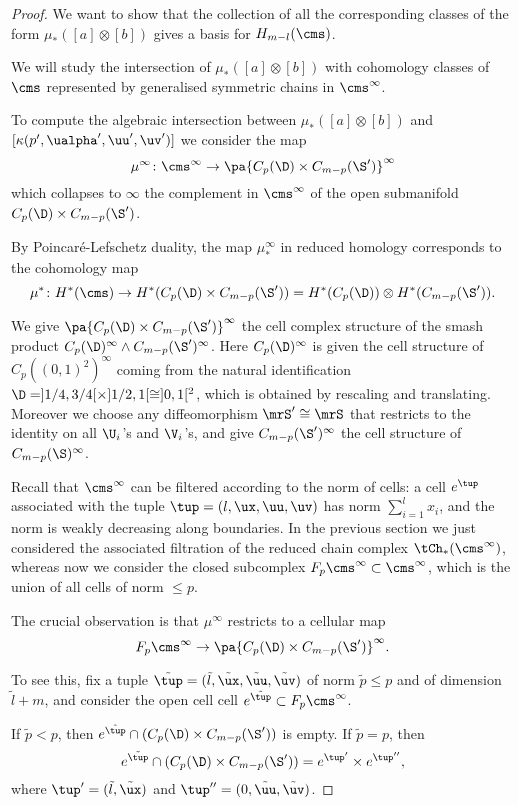 \begin{proof}
We want to show that the collection of all the corresponding classes of the form $\mu_*([a]\otimes [b])$
gives a basis for $H_{m-l}(\cms)$.

We will study
the intersection of $\mu_*([a]\otimes [b])$ with cohomology classes of $\cms$ represented by
generalised symmetric chains in $\cms^{\infty}$.

To compute the algebraic intersection
between $\mu_*([a]\otimes [b])$ and $[\kappa(p',\ualpha',\uu',\uv')]$ we
consider the map
\[
 \mu^{\infty}\colon \cms^{\infty}\to \pa{C_p(\D)\times C_{m-p}(\S')}^{\infty}
\]
which collapses to $\infty$ the complement in $\cms^{\infty}$ of the open submanifold $C_p(\D)\times C_{m-p}(\S')$.

By Poincaré-Lefschetz duality, the map $\mu^{\infty}_*$ in reduced homology corresponds to the cohomology map
\[
 \mu^*\colon H^*(\cms)\to H^*(C_p(\D)\times C_{m-p}(\S'))=H^*(C_p(\D))\otimes H^*(C_{m-p}(\S')).
\]

We give $\pa{C_p(\D)\times C_{m-p}(\S')}^{\infty}$ the cell complex structure of the smash product
$C_p(\D)^{\infty}\wedge C_{m-p}(\S')^{\infty}$. Here $C_p(\D)^{\infty}$ is given the cell structure of $C_p((0,1)^2)^{\infty}$
coming from the natural identification $\D=]1/4,3/4[\times]1/2,1[\cong]0,1[^2$, which is obtained by rescaling
and translating. Moreover we choose any diffeomorphism $\mrS'\cong\mrS$ that restricts to the identity
on all $\U_i$'s and $\V_i$'s, and give $C_{m-p}(\S')^{\infty}$ the cell structure of $C_{m-p}(\S)^{\infty}$.

Recall that $\cms^{\infty}$ can be filtered according to the norm of cells: a cell $e^{\tup}$ associated with
the tuple $\tup=(l,\ux,\uu,\uv)$ has norm $\sum_{i=1}^l x_i$, and the norm is weakly decreasing along boundaries.
In the previous section we just considered
the associated filtration of the reduced chain complex $\tCh_*(\cms^{\infty})$, whereas now we
consider the closed subcomplex $F_p\cms^{\infty}\subset\cms^{\infty}$, which is the union
of all cells of norm $\leq p$.

The crucial observation is that $\mu^{\infty}$ restricts to a cellular map 
\[
F_p\cms^{\infty}\to \pa{C_p(\D)\times C_{m-p}(\S')}^{\infty}.
\]

To see this, fix a tuple $\tilde{\tup}=(\tilde{l}, \tilde{\ux},\tilde{\uu},\tilde{\uv})$ of norm $\tilde{p}\leq p$
and of dimension $\tilde{l}+m$, and
consider the open cell
cell $e^{\tilde{\tup}}\subset F_p\cms^{\infty}$.

If $\tilde{p}<p$, then
$e^{\tilde{\tup}}\cap (C_p(\D)\times C_{m-p}(\S'))$ is empty. If $\tilde{p}=p$, then
\[
e^{\tilde{\tup}}\cap (C_p(\D)\times C_{m-p}(\S'))=e^{\tup'}\times e^{\tup''},
\]
where $\tup'=(\tilde{l},\tilde{\ux})$ and $\tup''=(0,\tilde{\uu},\tilde{\uv})$.


\end{proof}
